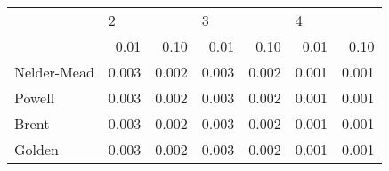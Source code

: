 \begin{tabular}{lrrrrrr}
\toprule
{} & \multicolumn{2}{l}{2} & \multicolumn{2}{l}{3} & \multicolumn{2}{l}{4} \\
{} &   0.01 &   0.10 &   0.01 &   0.10 &   0.01 &   0.10 \\
\midrule
Nelder-Mead &  0.003 &  0.002 &  0.003 &  0.002 &  0.001 &  0.001 \\
Powell      &  0.003 &  0.002 &  0.003 &  0.002 &  0.001 &  0.001 \\
Brent       &  0.003 &  0.002 &  0.003 &  0.002 &  0.001 &  0.001 \\
Golden      &  0.003 &  0.002 &  0.003 &  0.002 &  0.001 &  0.001 \\
\bottomrule
\end{tabular}
